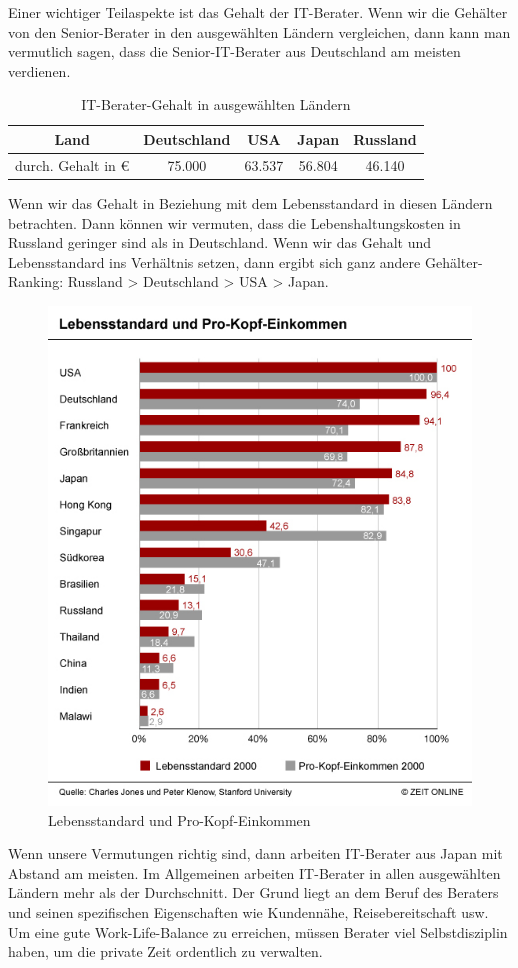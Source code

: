 Einer wichtiger Teilaspekte ist das Gehalt der IT-Berater. Wenn wir die Gehälter von den Senior-Berater in den ausgewählten Ländern vergleichen, dann kann man vermutlich sagen, dass die Senior-IT-Berater aus Deutschland am meisten verdienen.
\begin{table}[htp]

\begin{tabular}{|c|c|c|c|c|}
\hline Land & Deutschland & USA & Japan &  Russland\\ 
\hline durch. Gehalt in € & 75.000 & 63.537 & 56.804 &  46.140\\ 
\hline 
\end{tabular} 
\caption{IT-Berater-Gehalt in ausgewählten Ländern}
\end{table}

Wenn wir das Gehalt in Beziehung mit dem Lebensstandard	in diesen Ländern betrachten. Dann können wir vermuten, dass die Lebenshaltungskosten in Russland  geringer sind als in Deutschland. Wenn wir das Gehalt und Lebensstandard ins Verhältnis setzen, dann ergibt sich ganz andere Gehälter-Ranking: Russland > Deutschland > USA > Japan.
\begin{figure}[ht]
		\centering
		\includegraphics[width=0.7\linewidth]{./images/Lebensstandard-Pro-Kopf-Einkommen}
		\caption{Lebensstandard und Pro-Kopf-Einkommen \cite{LebensStd}}
		\label{fig:LebStdProKEink}
		\end{figure}
Wenn unsere Vermutungen richtig sind, dann arbeiten IT-Berater aus Japan mit Abstand am meisten. Im Allgemeinen arbeiten IT-Berater in allen ausgewählten Ländern mehr als der Durchschnitt. Der Grund liegt an dem Beruf des Beraters und seinen spezifischen Eigenschaften wie Kundennähe, Reisebereitschaft usw. Um eine gute Work-Life-Balance zu erreichen, müssen Berater viel Selbstdisziplin haben, um die private Zeit ordentlich zu verwalten.\\
